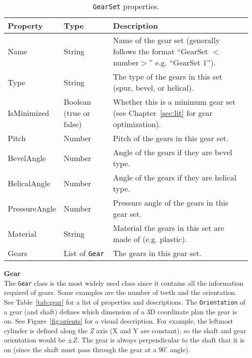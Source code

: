 \begin{doublespace}
\begin{table}[htbp]
    \centering
    \caption{\texttt{GearSet} properties.}
    \label{tab:gearset}
    \begin{tabularx}{1\textwidth}{||Y|Y|Y||}
    \hline Property & Type & Description \\ \hline \hline
    Name & String & Name of the gear set (generally follows the format ``GearSet $<$number$>$'' e.g. ``GearSet 1''). \\ \hline
    Type & String & The type of the gears in this set (spur, bevel, or helical). \\ \hline
    IsMinimized & Boolean (true or false) & Whether this is a minimum gear set (see Chapter~\ref{sec:lit} for gear optimization). \\ \hline
    Pitch & Number & Pitch of the gears in this gear set. \\ \hline
    BevelAngle & Number & Angle of the gears if they are bevel type. \\ \hline
    HelicalAngle & Number & Angle of the gears if they are helical type. \\ \hline
    PressureAngle & Number & Pressure angle of the gears in this gear set. \\ \hline
    Material & String & Material the gears in this set are made of (e.g. plastic). \\ \hline
    Gears & List of \texttt{Gear} & The gears in this gear set. \\ \hline
    \end{tabularx}
\end{table}


\noindent\textbf{Gear} \\
The \texttt{Gear} class is the most widely used class since it contains all the information required of gears. Some examples are the number of teeth and the orientation. See Table~\ref{tab:gear} for a list of properties and descriptions. The \texttt{Orientation} of a gear (and shaft) defines which dimension of a 3D coordinate plan the gear is on. See Figure~\ref{fig:orients} for a visual description. For example, the leftmost cylinder is defined along the \emph{Z} axis (X and Y are constant), so the shaft and gear orientation would be $\pm Z$. The gear is always perpendicular to the shaft that it is on (since the shaft must pass through the gear at a $90^{\circ}$ angle).

\begin{figure}[htbp]
\centering
\begin{tikzpicture}


\end{tikzpicture}
\end{figure}
\end{doublespace}
